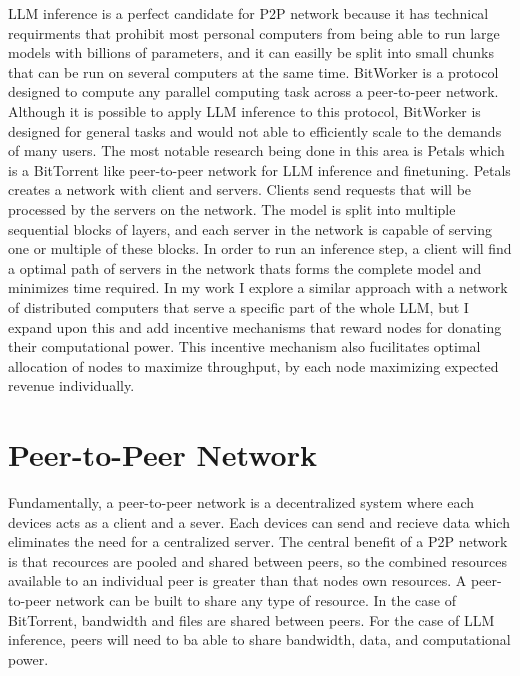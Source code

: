 \documentclass[preprint,twoside,11pt]{article}
\begin{document}
LLM inference is a perfect candidate for P2P network because it has technical requirments that prohibit most personal computers from being able to run
large models with billions of parameters, and it can easilly be split into small chunks that can be run on several computers at the same time. BitWorker \citep{Durand_Gasparyan_Rouvinez_Aad_Braun_Trinh_2015} is a protocol designed to compute any parallel computing task across a peer-to-peer network.
Although it is possible to apply LLM inference to this protocol, BitWorker is designed for general tasks and would not able to efficiently scale to the demands of many users.
The most notable research being done in this area is Petals \citep{borzunov2023petalscollaborativeinferencefinetuning} which is a BitTorrent like peer-to-peer network for LLM inference and finetuning.
Petals creates a network with client and servers. Clients send requests that will be processed by the servers on the network. The model is split into multiple sequential blocks of layers, and each server
in the network is capable of serving one or multiple of these blocks. In order to run an inference step, a client will find a optimal path of servers
in the network thats forms the complete model and minimizes time required. In my work I explore a similar approach with a network of distributed computers that serve a specific part of the whole LLM,
but I expand upon this and add incentive mechanisms that reward nodes for donating their computational power. This incentive mechanism also fucilitates optimal allocation of nodes to maximize throughput, by each
node maximizing expected revenue individually.

\section{Peer-to-Peer Network}

Fundamentally, a peer-to-peer network is a decentralized system where each devices acts as a client and a sever.
Each devices can send and recieve data which eliminates the need for a centralized server. The central benefit of a P2P network
is that recources are pooled and shared between peers, so the combined resources available to an individual peer is greater than that nodes own resources.
A peer-to-peer network can be built to share any type of resource. In the case of BitTorrent, bandwidth and files are shared between peers.
For the case of LLM inference, peers will need to ba able to share bandwidth, data, and computational power.
\end{document}
